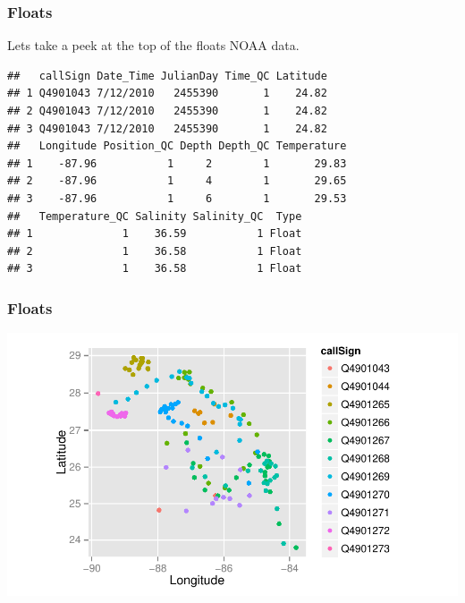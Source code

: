 \documentclass{beamer}\usepackage[]{graphicx}\usepackage[]{color}
\makeatletter
\newenvironment{kframe}{%
 \def\at@end@of@kframe{}%
 \ifinner\ifhmode%
  \def\at@end@of@kframe{\end{minipage}}%
  \begin{minipage}{\columnwidth}%
 \fi\fi%
 \def\FrameCommand##1{\hskip\@totalleftmargin \hskip-\fboxsep
 \colorbox{shadecolor}{##1}\hskip-\fboxsep
     \hskip-\linewidth \hskip-\@totalleftmargin \hskip\columnwidth}%
 \MakeFramed {\advance\hsize-\width
   \@totalleftmargin\z@ \linewidth\hsize
   \@setminipage}}%
 {\par\unskip\endMakeFramed%
 \at@end@of@kframe}
\newenvironment{knitrout}{}{} %
\makeatother
\begin{document}

\begin{frame}[fragile]
\frametitle{Floats}
Lets take a peek at the top of the floats NOAA data.

\small
\begin{knitrout}\footnotesize
{}\color{fgcolor}\begin{kframe}
\begin{verbatim}
##   callSign Date_Time JulianDay Time_QC Latitude
## 1 Q4901043 7/12/2010   2455390       1    24.82
## 2 Q4901043 7/12/2010   2455390       1    24.82
## 3 Q4901043 7/12/2010   2455390       1    24.82
##   Longitude Position_QC Depth Depth_QC Temperature
## 1    -87.96           1     2        1       29.83
## 2    -87.96           1     4        1       29.65
## 3    -87.96           1     6        1       29.53
##   Temperature_QC Salinity Salinity_QC  Type
## 1              1    36.59           1 Float
## 2              1    36.58           1 Float
## 3              1    36.58           1 Float
\end{verbatim}
\end{kframe}
\end{knitrout}
    \normalsize
\end{frame}



\begin{frame}[fragile]
\frametitle{Floats}

\begin{knitrout}\footnotesize
{}\color{fgcolor}

{\centering \includegraphics[width=.9\linewidth]{figure/kfloats2} 

}



\end{knitrout}

\end{frame}
\end{document}
